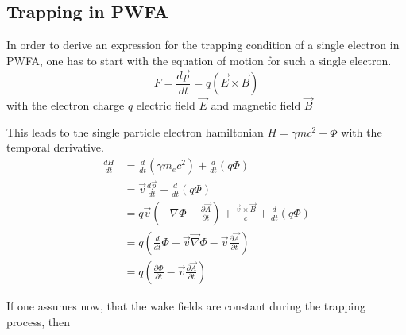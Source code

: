 \subsection{Trapping in PWFA}

In order to derive an expression for the trapping condition of a single electron in PWFA, one has to start with the equation of motion for such a single electron. 
\begin{equation}
F=\frac{d\vec{p}}{dt}=q(\vec{E}\times \vec{B})
\end{equation}
with the electron charge $q$ electric field $\vec{E}$ and magnetic field $\vec{B}$

This leads to the single particle electron hamiltonian $ H=\gamma m c^2+\Phi$ with the temporal derivative.
\begin{align}
\frac{dH}{dt}&=\frac{d}{dt} (\gamma m_e c^2)+\frac{d}{dt}(q\Phi)\\
&=\vec{v}\frac{d\vec{p}}{dt}+\frac{d}{dt}(q\Phi)\\
&=q\vec{v}(-\nabla \Phi-\frac{\partial \vec{A}}{\partial t})+\frac{\vec{v}\times\vec{B}}{c}+\frac{d}{dt}(q\Phi)\\
&=q(\frac{d}{dt}\Phi-\vec{v}\vec{\nabla}\Phi-\vec{v}\frac{\partial \vec{A}}{\partial t})\\
&=q(\frac{\partial \Phi}{\partial t}-\vec{v}\frac{\partial \vec{A}}{\partial t})
\end{align}

If one assumes now, that the wake fields are constant during the trapping process, then 

